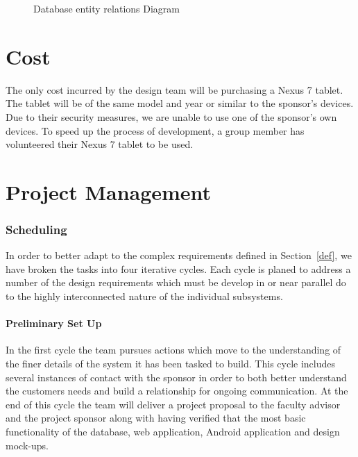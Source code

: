 \documentclass[Letter,11pt]{article}
\begin{document}
		\begin{figure}[h]
			\centering
			
			\caption{\label{ERdiogram} Database entity relations Diagram}
		\end{figure}
	

		
	
\part{Cost}
The only cost incurred by the design team will be purchasing a Nexus 7 tablet. The tablet will be of the same model and year or similar to the sponsor's devices.  Due to their security measures, we are unable to use one of the sponsor's own devices. To speed up the process of development, a group member has volunteered their Nexus 7 tablet to be used.
\part{Project Management}
\section{Scheduling}
		In order to better adapt to the complex requirements defined in Section~\ref{def}, we have broken the tasks into four iterative cycles. Each cycle is planed to address a number of the design requirements which must be develop in or near parallel do to the highly interconnected nature of the individual subsystems. 
		
		
	\subsection{Preliminary Set Up}\label{cyc1}
		In the first cycle the team pursues actions which move to the understanding of the finer details of the system it has been tasked to build. This cycle includes several instances of contact with the sponsor in order to both better understand the customers needs and build a relationship for ongoing communication. At the end of this cycle the team will deliver a project proposal to the faculty advisor and the project sponsor along with having verified that the most basic functionality of the database, web application, Android application and design mock-ups. 
		
\end{document}
